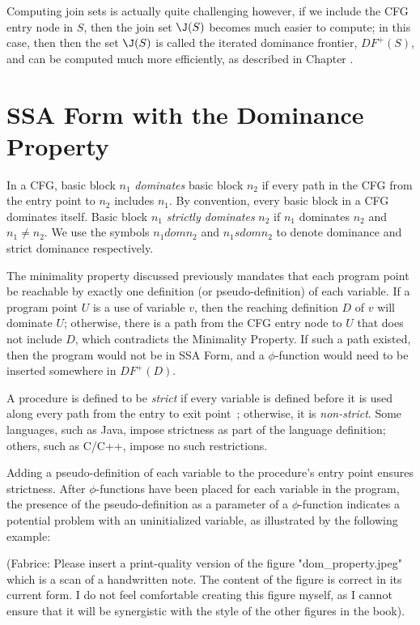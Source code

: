 Computing join sets is actually quite challenging however, if we include 
the CFG entry node in $S$, then the join set $\J(S)$ becomes much easier 
to compute; in this case, then  then the set $\J(S)$ is
called the iterated dominance frontier, $DF^{+}(S)$, and can be
computed much more efficiently, as described in Chapter 
\label{chap:classical_construction} .

\section{SSA Form with the Dominance Property}

In a CFG, basic block $n_{1}$ \emph{dominates} basic block $n_{2}$
if every path in the CFG from the entry point to $n_{2}$ includes
$n_{1}$. By convention, every basic block in a CFG dominates itself. Basic 
block $n_{1}$ \emph{strictly dominates} $n_{2}$ if $n_{1}$ dominates
$n_{2}$ and $n_{1} \neq n_{2}$. We use the symbols $n_{1} dom n_{2}$
and $n_{1} sdom n_{2}$ to denote dominance and strict dominance 
respectively.

The minimality property discussed previously mandates that each
program point be reachable by exactly one definition (or pseudo-definition)
of each variable. If a program point $U$ is a use of variable $v$, then the
reaching definition $D$ of $v$ will dominate $U$; otherwise, there is a path
from the CFG entry node to $U$ that does not include $D$, which contradicts
the Minimality Property. If such a  path existed, then the program would not
be in SSA Form, and a $\phi$-function would need to be inserted somewhere
in $DF^{+}(D)$.  

A procedure is defined to be \emph{strict} if every variable
is defined before it is used along every path from the entry
to exit point~\cite{BudimlicJun02}; otherwise, it is \emph{non-strict}. 
Some languages, such as Java, impose strictness as part of the language
definition; others, such as C/C++, impose no such restrictions. 
 
Adding a pseudo-definition of each variable to the procedure's entry
point ensures strictness. After $\phi$-functions have been placed
for each variable in the program, the presence of the pseudo-definition
as a parameter of a $\phi$-function indicates a potential problem with
an uninitialized variable, as illustrated by the following example:

(Fabrice: Please insert a print-quality version of the figure
"dom\_property.jpeg" which is a scan of a handwritten note. The
content of the figure is correct in its current form. I do not feel
comfortable creating this figure myself, as I cannot ensure that
it will be synergistic with the style of the other figures in the book).  
 
